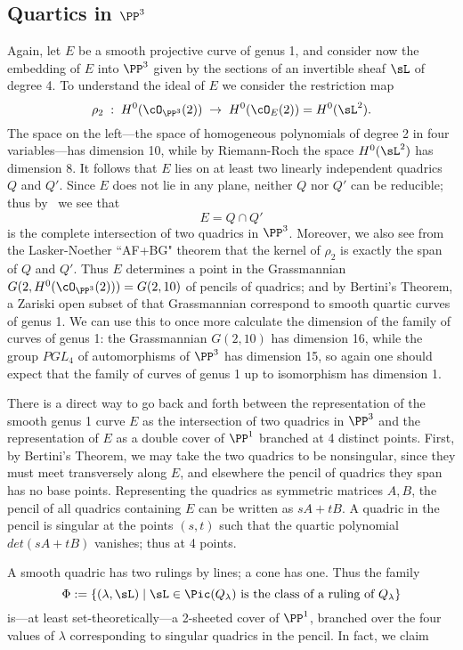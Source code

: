 \subsection{Quartics in $\PP^3$} 

Again, let $E$ be a smooth projective curve of genus 1, and consider now the embedding of $E$ into $\PP^3$ given by the sections of an invertible sheaf $\sL$ of degree 4. To understand the ideal of $E$ we consider the restriction map
$$
\rho_2 \;  : \; H^0(\cO_{\PP^3}(2)) \; \to \; H^0(\cO_{E}(2)) = H^0(\sL^2).
$$
The space on the left---the space of homogeneous polynomials of degree 2 in four variables---has dimension 10, while by Riemann-Roch the space $H^0(\sL^2)$ has dimension 8. It follows that $E$ lies on at least two linearly independent quadrics $Q$ and $Q'$. Since $E$ does not lie in any plane, neither $Q$ nor $Q'$ can be reducible; thus by \bt\ we see that
$$
E = Q \cap Q'
$$
is the complete intersection of two quadrics in $\PP^3$. Moreover, we also see from the Lasker-Noether ``AF+BG" theorem that the kernel of $\rho_2$ is exactly the span of $Q$ and $Q'$. Thus $E$ determines a point in the Grassmannian $G(2, H^0(\cO_{\PP^3}(2))) = G(2, 10)$ of pencils of quadrics; and by Bertini's Theorem, a Zariski open subset of that Grassmannian correspond to smooth quartic curves of genus 1. We can use this to once more calculate the dimension of the family of curves of genus 1: the Grassmannian $G(2,10)$ has dimension 16, while the group $PGL_4$ of automorphisms of $\PP^3$ has dimension 15, so again one should expect that the family of curves of genus 1 up to isomorphism has dimension 1.

There is a direct way to go back and forth between the representation of the smooth genus 1 curve $E$ as the intersection of two quadrics in $\PP^3$ and the representation of $E$ as a double cover
of $\PP^1$ branched at 4 distinct points. First, by Bertini's Theorem, we may take the two quadrics to be nonsingular, since they must meet transversely along $E$, and elsewhere the
pencil of quadrics they span has no base points. Representing the quadrics as symmetric matrices $A,B$, the pencil of all quadrics containing $E$ can be 
written as $sA+tB$. A quadric in the pencil is singular at the points $(s,t)$ such that the quartic polynomial $det(sA+tB)$ vanishes; thus at 4 points.

 A smooth quadric has two rulings by lines; a cone has one. Thus the family
$$
\Phi := \{ (\lambda, \sL) \mid \sL \in \Pic(Q_\lambda) \text{ is the class of a ruling of } Q_\lambda \}
$$
is---at least set-theoretically---a 2-sheeted cover of $\PP^1$, branched over the four values of $\lambda$ corresponding to singular quadrics in the pencil. In fact, we claim

